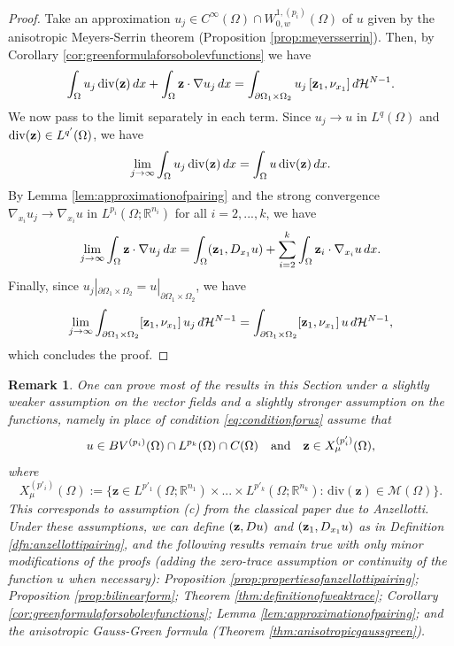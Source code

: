 \documentclass[reqno,12pt]{amsart}
\def\z{{\bf z}}
\newtheorem{remark}[theorem]{Remark}
\def\R{\mathbb R}
\numberwithin{equation}{section}
\begin{document}
\begin{proof}
Take an approximation $u_j \in C^\infty(\Omega) \cap W_{0,w}^{1,(p_i)}(\Omega)$ of $u$ given by the anisotropic Meyers-Serrin theorem (Proposition \ref{prop:meyersserrin}). Then, by Corollary \ref{cor:greenformulaforsobolevfunctions} we have
\begin{equation}
\int_{\Omega} u_j \, \mathrm{div}(\z) \, dx + \int_\Omega \z \cdot \nabla u_j \, dx = \int_{\partial\Omega_1 \times \Omega_2} u_j \, [\z_1, \nu_{x_1}] \,d\mathcal{H}^{N-1}.
\end{equation}
We now pass to the limit separately in each term. Since $u_j \rightarrow u$ in $L^q(\Omega)$ and $\mathrm{div}(\z) \in L^{q'}(\Omega)$, we have
\begin{equation}
\lim_{j \rightarrow \infty} \int_{\Omega} u_j \, \mathrm{div}(\z) \, dx = \int_{\Omega} u \, \mathrm{div}(\z) \, dx.
\end{equation}
By Lemma \ref{lem:approximationofpairing} and the strong convergence $\nabla_{x_i} u_j \rightarrow \nabla_{x_i} u$ in $L^{p_i}(\Omega; \mathbb{R}^{n_i})$ for all $i = 2, ..., k$, we have
$$ \lim_{j \rightarrow \infty} \int_\Omega \z \cdot \nabla u_j \, dx = \int_\Omega (\z_1, D_{x_1} u) + \sum_{i=2}^k \int_\Omega \z_i \cdot \nabla_{x_i} u \, dx.$$
Finally, since $u_j|_{\partial\Omega_1 \times \Omega_2} = u|_{\partial\Omega_1 \times \Omega_2}$, we have
$$ \lim_{j \rightarrow \infty} \int_{\partial\Omega_1 \times \Omega_2} [\z_1, \nu_{x_1}] \, u_j \, d\mathcal{H}^{N-1} = \int_{\partial\Omega_1 \times \Omega_2} [\z_1, \nu_{x_1}] \, u \, d\mathcal{H}^{N-1},$$
which concludes the proof.
\end{proof}

\begin{remark}
One can prove most of the results in this Section under a slightly weaker assumption on the vector fields and a slightly stronger assumption on the functions, namely in place of condition \eqref{eq:conditionforuz} assume that
\begin{equation}
u \in BV^{(p_i)}(\Omega) \cap L^{p_k}(\Omega) \cap C(\Omega) \quad \mbox{and} \quad \z \in X^{(p'_i)}_\mu(\Omega),
\end{equation}
where
\begin{equation}
X^{(p'_i)}_\mu(\Omega) := \bigg\{ \mathbf{z} \in L^{p'_1}(\Omega; \R^{n_1}) \times ... \times L^{p'_k}(\Omega; \R^{n_k}): \, \mathrm{div}(\mathbf{z}) \in \mathcal{M}(\Omega) \bigg\}.
\end{equation}
This corresponds to assumption (c) from the classical paper \cite{Anzellotti} due to Anzellotti. Under these assumptions, we can define $(\z, Du)$ and $(\z_1, D_{x_1} u)$ as in Definition \ref{dfn:anzellottipairing}, and the following results remain true with only minor modifications of the proofs (adding the zero-trace assumption or continuity of the function $u$ when necessary): Proposition \ref{prop:propertiesofanzellottipairing}; Proposition \ref{prop:bilinearform}; Theorem \ref{thm:definitionofweaktrace}; Corollary \ref{cor:greenformulaforsobolevfunctions}; Lemma \ref{lem:approximationofpairing}; and the anisotropic Gauss-Green formula (Theorem \ref{thm:anisotropicgaussgreen}).
\end{remark}
\end{document}
